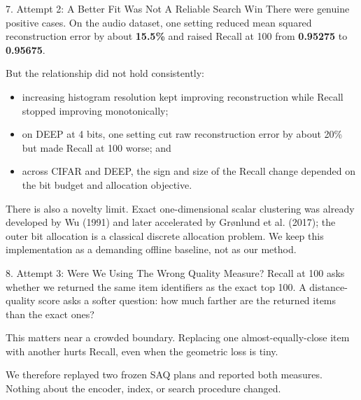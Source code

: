\documentclass[
  ignorenonframetext,
  aspectratio=169,
]{beamer}
\providecommand{\tightlist}{%
  \setlength{\itemsep}{0pt}\setlength{\parskip}{0pt}}
\begin{document}
\begin{frame}{7. Attempt 2: A Better Fit Was Not A Reliable Search Win}
\protect{}\label{7-attempt-2-a-better-fit-was-not-a-reliable-search-win}
There were genuine positive cases. On the audio dataset, one setting
reduced mean squared reconstruction error by about \textbf{15.5\%} and
raised Recall at 100 from \textbf{0.95275} to \textbf{0.95675}.

But the relationship did not hold consistently:

\begin{itemize}
\tightlist
\item
  increasing histogram resolution kept improving reconstruction while
  Recall stopped improving monotonically;
\item
  on DEEP at 4 bits, one setting cut raw reconstruction error by about
  20\% but made Recall at 100 worse; and
\item
  across CIFAR and DEEP, the sign and size of the Recall change depended
  on the bit budget and allocation objective.
\end{itemize}

There is also a novelty limit. Exact one-dimensional scalar clustering
was already developed by Wu (1991) and later accelerated by Grønlund et
al. (2017); the outer bit allocation is a classical discrete allocation
problem. We keep this implementation as a demanding offline baseline,
not as our method.
\end{frame}

\begin{frame}{8. Attempt 3: Were We Using The Wrong Quality Measure?}
\protect{}\label{8-attempt-3-were-we-using-the-wrong-quality-measure}
Recall at 100 asks whether we returned the same item identifiers as the
exact top 100. A distance-quality score asks a softer question: how much
farther are the returned items than the exact ones?

This matters near a crowded boundary. Replacing one almost-equally-close
item with another hurts Recall, even when the geometric loss is tiny.

We therefore replayed two frozen SAQ plans and reported both measures.
Nothing about the encoder, index, or search procedure changed.
\end{frame}
\end{document}
